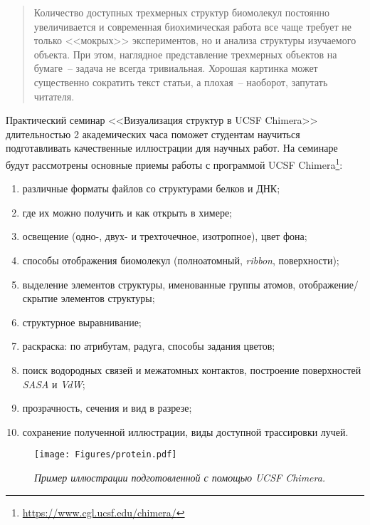 \begin{abstract}
Количество доступных трехмерных структур биомолекул постоянно увеличивается и современная биохимическая работа все чаще требует не только <<мокрых>> экспериментов, но и анализа структуры изучаемого объекта. При этом, наглядное представление трехмерных объектов на бумаге~-- задача не всегда тривиальная. Хорошая картинка может существенно сократить текст статьи, а плохая~-- наоборот, запутать читателя. 
\end{abstract}

Практический семинар <<Визуализация структур в UCSF Chimera>> длительностью 2 академических часа поможет студентам научиться подготавливать качественные иллюстрации для научных работ. На семинаре будут рассмотрены основные приемы работы с программой UCSF Chimera\footnote{\url{https://www.cgl.ucsf.edu/chimera/}}:
\begin{enumerate}
    \item различные форматы файлов со структурами белков и ДНК; %
    \item где их можно получить и как открыть в химере; %
    \item освещение (одно-, двух- и трехточечное, изотропное), цвет фона; %
    \item способы отображения биомолекул (полноатомный, \textit{ribbon}, поверхности); %
    \item выделение элементов структуры, именованные группы атомов, отображение/скрытие элементов структуры;
    \item структурное выравнивание;
    \item раскраска: по атрибутам, радуга, способы задания цветов; %
    \item поиск водородных связей и межатомных контактов, построение поверхностей \textit{SASA} и \textit{VdW};
    \item прозрачность, сечения и вид в разрезе;
    \item сохранение полученной иллюстрации, виды доступной трассировки лучей.
\end{enumerate}
\hfill
\begin{figure}[h!]
  \texttt{[image: Figures/protein.pdf]}
  \caption{\textit{Пример иллюстрации подготовленной с помощью UCSF Chimera.}}
  \label{fig:smug}
\end{figure}